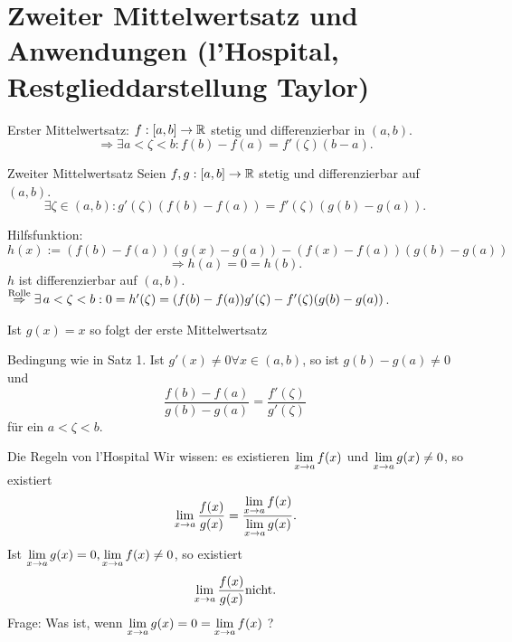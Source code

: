\documentclass[../ana2.tex]{subfiles}
\begin{document}
\setcounter{section}{1}
\section{Zweiter Mittelwertsatz und Anwendungen (l'Hospital, Restglieddarstellung Taylor)}

Erster Mittelwertsatz: \( f: [a,b] \rightarrow \mathbb{R} \) 
stetig und differenzierbar in \( (a,b) \).
\[ \Rightarrow \exists a < \zeta < b : 
f(b) - f(a) = f'(\zeta)(b-a). \]
\begin{satz}{Zweiter Mittelwertsatz}
    Seien \(f,g:[a,b]\rightarrow \mathbb{R} \) stetig und 
    differenzierbar auf \( (a,b) \).
    \[ \exists \zeta \in (a,b): g'(\zeta)(f(b) - f(a)) 
    = f'(\zeta) (g(b) - g(a)). \]
\end{satz}
\begin{bew}
    Hilfsfunktion: 
    \[ h(x) := (f(b) - f(a))(g(x) - g(a)) 
    - (f(x) - f(a))(g(b) - g(a)) \]
    \[ \Rightarrow h(a) = 0 = h(b). \]
    \( h \) ist differenzierbar auf \( (a,b) \).
    \( \oversett{Rolle}{\Rightarrow} 
    \exists a < \zeta < b : 0 = h'(\zeta) 
    = (f(b) - f(a))g'(\zeta) - f'(\zeta)(g(b) - g(a)) \).
\end{bew}
\begin{bem}
    Ist \( g(x) = x \) so folgt der erste Mittelwertsatz
\end{bem}
\begin{kor}
    Bedingung wie in Satz 1. 
    Ist \( g'(x) \neq 0 \forall x\in (a,b) \), 
    so ist \( g(b) - g(a) \neq 0 \) und 
    \[ \frac{f(b)-f(a)}{g(b)-g(a)} 
    = \frac{f'(\zeta)}{g'(\zeta)} \]
    für ein \( a < \zeta < b \).
\end{kor}
\large{Die Regeln von l'Hospital}
\normalsize
\noindent
Wir wissen: es existieren \( \lim\limits_{x\rightarrow{}a} f(x) \) und 
\( \lim\limits_{x\rightarrow{}a} g(x) \neq 0 \), so existiert 
\[ \lim\limits_{x\rightarrow{}a} \frac{f(x)}{g(x)} 
= \frac{ \lim\limits_{x\rightarrow{}a}f(x) }{ \lim\limits_{x\rightarrow{}a}g(x) }. \]
Ist \( \lim\limits_{x\rightarrow{}a} g(x) = 0, \lim\limits_{x\rightarrow{}a} f(x) \neq 0 \), 
so existiert
\[ \lim\limits_{x\rightarrow{}a} \frac{f(x)}{g(x)} \text{nicht.} \]
Frage: Was ist, wenn \( \lim\limits_{x\rightarrow{}a}g(x) = 0 = \lim\limits_{x\rightarrow{}a}f(x) \) ?
\end{document}
